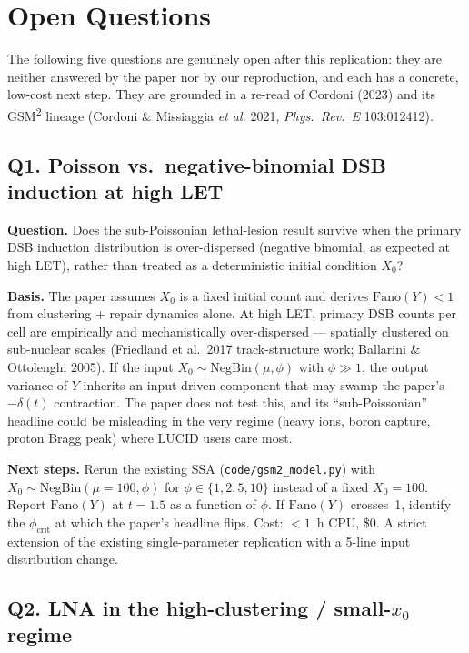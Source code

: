 \section{Open Questions}
\label{sec:open-questions}

The following five questions are genuinely open after this replication: they are neither answered by the paper nor by our reproduction, and each has a concrete, low-cost next step.  They are grounded in a re-read of Cordoni (2023) and its GSM\textsuperscript{2} lineage (Cordoni \& Missiaggia \emph{et al.} 2021, \emph{Phys.\ Rev.\ E} 103:012412).

\subsection*{Q1.  Poisson vs.\ negative-binomial DSB induction at high LET}

\textbf{Question.}  Does the sub-Poissonian lethal-lesion result survive when the primary DSB induction distribution is over-dispersed (negative binomial, as expected at high LET), rather than treated as a deterministic initial condition $X_0$?

\textbf{Basis.}  The paper assumes $X_0$ is a fixed initial count and derives $\mathrm{Fano}(Y)<1$ from clustering + repair dynamics alone.  At high LET, primary DSB counts per cell are empirically and mechanistically over-dispersed --- spatially clustered on sub-nuclear scales (Friedland et al.\ 2017 track-structure work; Ballarini \& Ottolenghi 2005).  If the input $X_0\sim\mathrm{NegBin}(\mu,\phi)$ with $\phi\gg 1$, the output variance of $Y$ inherits an input-driven component that may swamp the paper's $-\delta(t)$ contraction.  The paper does not test this, and its ``sub-Poissonian'' headline could be misleading in the very regime (heavy ions, boron capture, proton Bragg peak) where LUCID users care most.

\textbf{Next steps.}  Rerun the existing SSA (\verb|code/gsm2_model.py|) with $X_0\sim\mathrm{NegBin}(\mu=100,\phi)$ for $\phi\in\{1,2,5,10\}$ instead of a fixed $X_0=100$.  Report $\mathrm{Fano}(Y)$ at $t=1.5$ as a function of $\phi$.  If $\mathrm{Fano}(Y)$ crosses~1, identify the $\phi_\mathrm{crit}$ at which the paper's headline flips.  Cost: $<1$~h CPU, \$0.  A strict extension of the existing single-parameter replication with a 5-line input distribution change.

\subsection*{Q2.  LNA in the high-clustering / small-$x_0$ regime}

